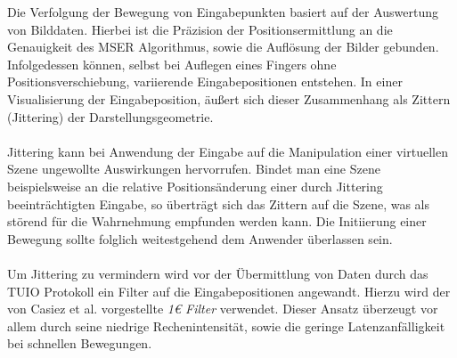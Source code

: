 Die Verfolgung der Bewegung von Eingabepunkten basiert auf der Auswertung von Bilddaten. Hierbei ist die Präzision der Positionsermittlung an die Genauigkeit des MSER Algorithmus, sowie die Auflösung der Bilder gebunden. Infolgedessen können, selbst bei Auflegen eines Fingers ohne Positionsverschiebung, variierende Eingabepositionen entstehen. In einer Visualisierung der Eingabeposition, äußert sich dieser Zusammenhang als Zittern (Jittering) der Darstellungsgeometrie.
\\\\
Jittering kann bei Anwendung der Eingabe auf die Manipulation einer virtuellen Szene ungewollte Auswirkungen hervorrufen. Bindet man eine Szene beispielsweise an die relative Positionsänderung einer durch Jittering beeinträchtigten Eingabe, so überträgt sich das Zittern auf die Szene, was als störend für die Wahrnehmung empfunden werden kann. Die Initiierung einer Bewegung sollte folglich weitestgehend dem Anwender überlassen sein.
\\\\ 
Um Jittering zu vermindern wird vor der Übermittlung von Daten durch das TUIO Protokoll ein Filter auf die Eingabepositionen angewandt. Hierzu wird der von Casiez et al. vorgestellte \emph{1\euro{} Filter} verwendet. Dieser Ansatz überzeugt vor allem durch seine niedrige Rechenintensität, sowie die geringe Latenzanfälligkeit bei schnellen Bewegungen. 


